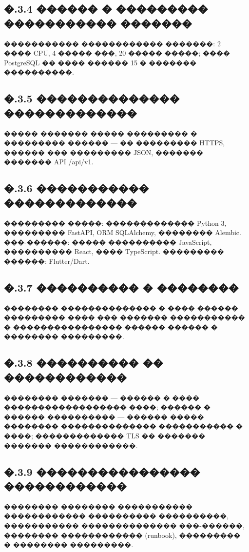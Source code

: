 \subsection*{�.3.4 ������ � ��������� ����������� �������}

����������� ������������ �������: 2 ���� CPU, 4 ����� ���, 20 ����� �����; ���� PostgreSQL �� ���� ������ 15 � ������� ����������.

\subsection*{�.3.5 �������������� �������������}

����� ������� ����� ��������� � ��������� ������ --- �� ��������� HTTPS, ������ ��� ��������� JSON, ������� ������� API /api/v1.

\subsection*{�.3.6 ����������� �������������}

��������� �����: ������������� Python 3, ��������� FastAPI, ORM SQLAlchemy, �������� Alembic. ���-������: ����� ���������� JavaScript, ���������� React, ���� TypeScript. ��������� ������: Flutter/Dart.

\subsection*{�.3.7 ���������� � ��������}

�������� �������������� � ���� ������ ��������� ���� ��� ������� ����������� � ���������������� ������ ������ � �������� ���������.

\subsection*{�.3.8 ���������� �� ������������}

�������� ������� --- ������ � ���� ������������������ ����; ������ � ������ ���������� --- ������ ����� �������� �������������� ����������� � ����; ������������� TLS �� ������� ������� ������������.

\subsection*{�.3.9 ���������������� ������������}

�������� �������� ����������� ������������ ���������� ����������, ����������� �������������� ���-������, �������� ������������ (runbook), ��������� � �������� ���������.

